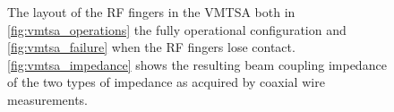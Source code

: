 \begin{figure}
\subfigure[]{

\label{fig:vmtsa_operations}
}
\subfigure[]{

\label{fig:vmtsa_failure}
}

\subfigure[]{

\label{fig:vmtsa_impedance}
}


\label{fig:rf_finger_imp}
\caption{The layout of the RF fingers in the VMTSA both in \ref{fig:vmtsa_operations} the fully operational configuration and \ref{fig:vmtsa_failure} when the RF fingers lose contact. \ref{fig:vmtsa_impedance} shows the resulting beam coupling impedance of the two types of impedance as acquired by coaxial wire measurements.}
\end{figure}